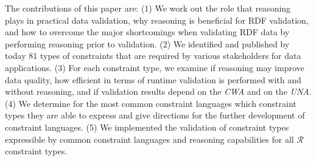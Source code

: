 \documentclass{acm_proc_article-sp}
\newcommand{\tb}[1]{\todo[size=\small, color=green!40]{\textbf{Thomas:} #1}}
\begin{document}
The contributions of this paper are:
(1) We work out the role that reasoning plays in practical data validation,
why reasoning is beneficial for RDF validation, and 
how to overcome the major shortcomings when validating RDF data by performing reasoning prior to validation. 
(2) We identified and published by today 81 types of constraints that are required by various stakeholders for data applications. 
(3) For each constraint type, we examine
    if reasoning may improve data quality, 
    how efficient in terms of runtime validation is performed with and without reasoning, and
		if validation results depend on the \emph{CWA} and on the \emph{UNA}.
(4) We determine for the most common constraint languages which constraint types they are able to express
    and give directions for the further development of constraint languages.
(5) We implemented the validation of constraint types expressible by common constraint languages and reasoning capabilities for all $\mathcal{R}$ constraint types.
	




\end{document}
